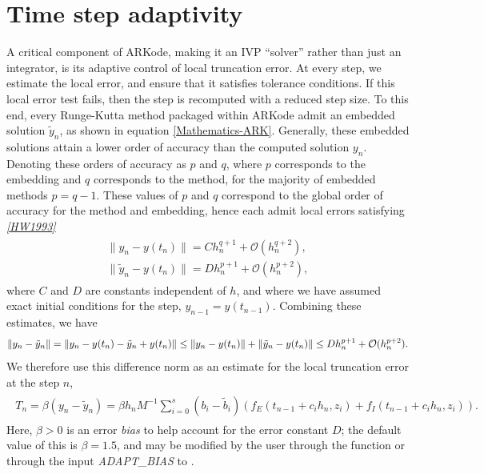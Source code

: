 \documentclass[letterpaper,10pt,english]{sphinxmanual}
\begin{document}
\section{Time step adaptivity}
\label{Mathematics:time-step-adaptivity}\label{Mathematics:mathematics-adaptivity}
A critical component of ARKode, making it an IVP ``solver'' rather than
just an integrator, is its adaptive control of local truncation error.
At every step, we estimate the local error, and ensure that it
satisfies tolerance conditions.  If this local error test fails, then
the step is recomputed with a reduced step size.  To this end, every
Runge-Kutta method packaged within ARKode admit an embedded solution
\(\tilde{y}_n\), as shown in equation \eqref{Mathematics-ARK}. Generally, these
embedded solutions attain a lower order of accuracy than the computed
solution \(y_n\).  Denoting these orders of accuracy as \(p\)
and \(q\), where \(p\) corresponds to the embedding and
\(q\) corresponds to the method, for the majority of embedded
methods \(p = q-1\).  These values of \(p\) and \(q\)
correspond to the global order of accuracy for the method and
embedding, hence each admit local errors satisfying \label{Mathematics:id7}{\hyperref[References:hw1993]{\emph{{[}HW1993{]}}}}
\label{Mathematics:equation-AsymptoticErrors}\begin{gather}
\begin{split}\| y_n - y(t_n) \| = C h_n^{q+1} + \mathcal O(h_n^{q+2}), \\
\| \tilde{y}_n - y(t_n) \| = D h_n^{p+1} + \mathcal O(h_n^{p+2}),\end{split}\label{Mathematics-AsymptoticErrors}
\end{gather}
where \(C\) and \(D\) are constants independent of \(h\),
and where we have assumed exact initial conditions for the step,
\(y_{n-1} = y(t_{n-1})\). Combining these estimates, we have
\begin{gather}
\begin{split}\| y_n - \tilde{y}_n \| = \| y_n - y(t_n) - \tilde{y}_n + y(t_n) \|
\le \| y_n - y(t_n) \| + \| \tilde{y}_n - y(t_n) \|
\le D h_n^{p+1} + \mathcal O(h_n^{p+2}).\end{split}\notag
\end{gather}
We therefore use this difference norm as an estimate for the local
truncation error at the step \(n\),
\label{Mathematics:equation-LTE}\begin{gather}
\begin{split}T_n = \beta \left(y_n - \tilde{y}_n\right) =
\beta h_n M^{-1} \sum_{i=0}^{s} \left(b_i - \tilde{b}_i\right)
\left(f_E(t_{n-1} + c_i h_n, z_i) + f_I(t_{n-1} + c_i h_n, z_i)\right).\end{split}\label{Mathematics-LTE}
\end{gather}
Here, \(\beta>0\) is an error \emph{bias} to help account for the error
constant \(D\); the default value of this is \(\beta = 1.5\),
and may be modified by the user through the function
{\hyperref[c_interface/User_callable:c.ARKodeSetErrorBias]{\emph{}}} or through the input \emph{ADAPT\_BIAS} to
{\hyperref[f_interface/Usage:f/_/FARKSETRIN]{\emph{}}}.
\end{document}
